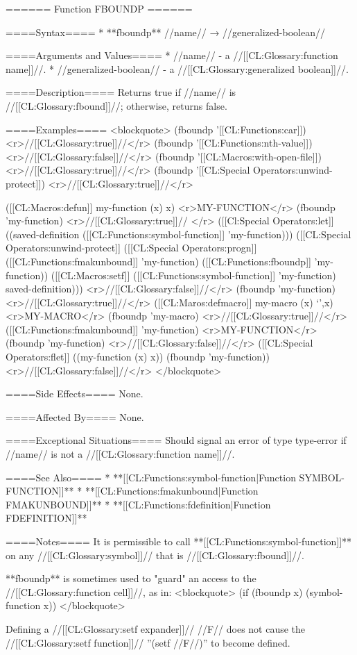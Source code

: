 ====== Function FBOUNDP ======

====Syntax====
  * **fboundp** //name// → //generalized-boolean//

====Arguments and Values====
  * //name// - a //[[CL:Glossary:function name]]//.
  * //generalized-boolean// - a //[[CL:Glossary:generalized boolean]]//.

====Description====
Returns true if //name// is //[[CL:Glossary:fbound]]//; otherwise, returns false.

====Examples====
<blockquote>
(fboundp '[[CL:Functions:car]]) <r>//[[CL:Glossary:true]]//</r>
(fboundp '[[CL:Functions:nth-value]]) <r>//[[CL:Glossary:false]]//</r>
(fboundp '[[CL:Macros:with-open-file]]) <r>//[[CL:Glossary:true]]//</r>
(fboundp '[[CL:Special Operators:unwind-protect]]) <r>//[[CL:Glossary:true]]//</r>

([[CL:Macros:defun]] my-function (x) x) <r>MY-FUNCTION</r>
(fboundp 'my-function) <r>//[[CL:Glossary:true]]// </r>
([[Cl:Special Operators:let]] ((saved-definition ([[CL:Functions:symbol-function]] 'my-function)))
  ([[CL:Special Operators:unwind-protect]]
      ([[CL:Special Operators:progn]]
        ([[CL:Functions:fmakunbound]] 'my-function)
        ([[CL:Functions:fboundp]] 'my-function))
    ([[CL:Macros:setf]] ([[CL:Functions:symbol-function]] 'my-function) saved-definition)))
  <r>//[[CL:Glossary:false]]//</r>
(fboundp 'my-function) <r>//[[CL:Glossary:true]]//</r>
([[CL:Maros:defmacro]] my-macro (x) `',x) <r>MY-MACRO</r>
(fboundp 'my-macro) <r>//[[CL:Glossary:true]]//</r>
([[CL:Functions:fmakunbound]] 'my-function) <r>MY-FUNCTION</r>
(fboundp 'my-function) <r>//[[CL:Glossary:false]]//</r>
([[CL:Special Operators:flet]] ((my-function (x) x)) 
  (fboundp 'my-function)) 
  <r>//[[CL:Glossary:false]]//</r>
</blockquote>

====Side Effects====
None.

====Affected By====
None.

====Exceptional Situations====
Should signal an error of type type-error if //name// is not a //[[CL:Glossary:function name]]//.

====See Also====
  * **[[CL:Functions:symbol-function|Function SYMBOL-FUNCTION]]**
  * **[[CL:Functions:fmakunbound|Function FMAKUNBOUND]]**
  * **[[CL:Functions:fdefinition|Function FDEFINITION]]**

====Notes====
It is permissible to call **[[CL:Functions:symbol-function]]** on any //[[CL:Glossary:symbol]]// that is //[[CL:Glossary:fbound]]//.

**fboundp** is sometimes used to "guard" an access to the //[[CL:Glossary:function cell]]//, as in: 
<blockquote>
(if (fboundp x) (symbol-function x))
</blockquote>

Defining a //[[CL:Glossary:setf expander]]// //F// does not cause the //[[CL:Glossary:setf function]]// ''(setf //F//)'' to become defined.

 
